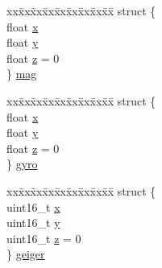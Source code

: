 \begin{DoxyCompactItemize}
\begin{tabbing}
\end{tabbing}\item 
\begin{tabbing}
xx\=xx\=xx\=xx\=xx\=xx\=xx\=xx\=xx\=\kill
struct \{\\
\>float \hyperlink{structdata__struct_aafb6ee9f998bdf479137e058e54c8605}{x}\\
\>float \hyperlink{structdata__struct_a907e433dba309a2e973da7f346b8d619}{y}\\
\>float \hyperlink{structdata__struct_a99537ca31fb73ac23386af3748921b53}{z} = 0\\
\} \hyperlink{structdata__struct_a30a07c1e9b8dbcf4f0bffcc7bc5794fe}{mag}\\

\end{tabbing}\item 
\begin{tabbing}
xx\=xx\=xx\=xx\=xx\=xx\=xx\=xx\=xx\=\kill
struct \{\\
\>float \hyperlink{structdata__struct_aafb6ee9f998bdf479137e058e54c8605}{x}\\
\>float \hyperlink{structdata__struct_a907e433dba309a2e973da7f346b8d619}{y}\\
\>float \hyperlink{structdata__struct_a99537ca31fb73ac23386af3748921b53}{z} = 0\\
\} \hyperlink{structdata__struct_abda148daacfe93267bf35e5a7ab18c23}{gyro}\\

\end{tabbing}\item 
\begin{tabbing}
xx\=xx\=xx\=xx\=xx\=xx\=xx\=xx\=xx\=\kill
struct \{\\
\>uint16\_t \hyperlink{structdata__struct_a11ce2a30e7dc48b21b7f06b4bb6e4ed7}{x}\\
\>uint16\_t \hyperlink{structdata__struct_a7555c56e9ddf0a0f0f9a29410f221dec}{y}\\
\>uint16\_t \hyperlink{structdata__struct_a57bb6a98c0a24ff59ef2decf0d51b611}{z} = 0\\
\} \hyperlink{structdata__struct_a27a2fc394140d1d68724703f6a50a23c}{geiger}\\


\end{tabbing}
\end{DoxyCompactItemize}
